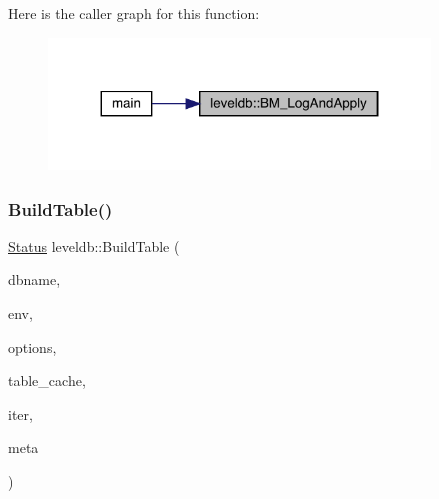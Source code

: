 Here is the caller graph for this function\+:
\nopagebreak
\begin{figure}[H]
\begin{center}
\leavevmode
\includegraphics[width=287pt]{namespaceleveldb_af9cf6ec167c9b6f25fd050ab6fb67a90_icgraph}
\end{center}
\end{figure}
\mbox{\label{namespaceleveldb_a10e102da98819e1a1f9b254241482e65}} 
\subsubsection{\texorpdfstring{BuildTable()}{BuildTable()}}
{\footnotesize\ttfamily \mbox{\hyperlink{classleveldb_1_1_status}{Status}} leveldb\+::\+Build\+Table (\begin{DoxyParamCaption}\item[{const std\+::string \&}]{dbname,  }\item[{\mbox{\hyperlink{classleveldb_1_1_env}{Env}} $\ast$}]{env,  }\item[{const \mbox{\hyperlink{structleveldb_1_1_options}{Options}} \&}]{options,  }\item[{\mbox{\hyperlink{classleveldb_1_1_table_cache}{Table\+Cache}} $\ast$}]{table\+\_\+cache,  }\item[{\mbox{\hyperlink{classleveldb_1_1_iterator}{Iterator}} $\ast$}]{iter,  }\item[{\mbox{\hyperlink{structleveldb_1_1_file_meta_data}{File\+Meta\+Data}} $\ast$}]{meta }\end{DoxyParamCaption})}

